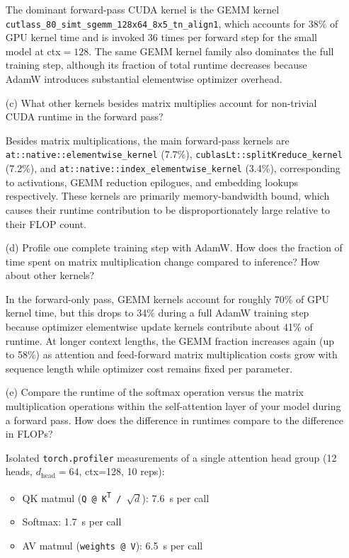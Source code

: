 \documentclass[letterpaper]{article}
\begin{document}
\begin{itemize}
		The dominant forward-pass CUDA kernel is the GEMM kernel \texttt{cutlass\_80\_simt\_sgemm\_128x64\_8x5\_tn\_align1}, which accounts for 38\% of GPU kernel time and is invoked 36 times per forward step for the small model at ctx\(=128\). The same GEMM kernel family also dominates the full training step, although its fraction of total runtime decreases because AdamW introduces substantial elementwise optimizer overhead.
		
		\item[(c)] What other kernels besides matrix multiplies account for non-trivial CUDA runtime in the forward pass?
		
		Besides matrix multiplications, the main forward-pass kernels are \texttt{at::native::elementwise\_kernel} (7.7\%), \texttt{cublasLt::splitKreduce\_kernel} (7.2\%), and \texttt{at::native::index\_elementwise\_kernel} (3.4\%), corresponding to activations, GEMM reduction epilogues, and embedding lookups respectively. These kernels are primarily memory-bandwidth bound, which causes their runtime contribution to be disproportionately large relative to their FLOP count.
		
		\item[(d)] Profile one complete training step with AdamW. How does the fraction of time spent on matrix multiplication change compared to inference? How about other kernels?
		
		In the forward-only pass, GEMM kernels account for roughly 70\% of GPU kernel time, but this drops to 34\% during a full AdamW training step because optimizer elementwise update kernels contribute about 41\% of runtime. At longer context lengths, the GEMM fraction increases again (up to 58\%) as attention and feed-forward matrix multiplication costs grow with sequence length while optimizer cost remains fixed per parameter.
		
		\item[(e)] Compare the runtime of the softmax operation versus the matrix multiplication operations within the self-attention layer of your model during a forward pass. How does the difference in runtimes compare to the difference in FLOPs?
		
		Isolated \texttt{torch.profiler} measurements of a single attention head group (12 heads, $d_{\text{head}}=64$, ctx=128, 10 reps):
		\begin{itemize}
			\item QK matmul (\texttt{Q @ K\textsuperscript{T} / $\sqrt{d}$}): 7.6~\textmu s per call
			\item Softmax: 1.7~\textmu s per call
			\item AV matmul (\texttt{weights @ V}): 6.5~\textmu s per call
		\end{itemize}


\end{itemize}
\end{document}

